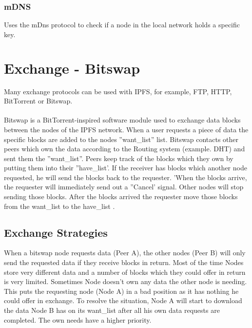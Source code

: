\documentclass[a4paper,11pt, oneside]{report}
\theoremstyle{definition}
\begin{document}
\subsubsection{mDNS}
Uses the mDns protocol to check if a node in the local network holds a specific key.


\newpage
\section{Exchange - Bitswap}
Many exchange protocols can be used with IPFS, for example, FTP, HTTP, BitTorrent or Bitswap.\\ \\
Bitswap is a BitTorrent-inspired software module used to exchange data blocks between the nodes of the IPFS network. When a user requests a piece of data the specific blocks are added to the nodes ''want\_list'' list. Bitswap contacts other peers which own the data according to the Routing system (example. DHT) and sent them the ''want\_list''. Peers keep track of the blocks which they own by putting them into their ''have\_list'. If the receiver has blocks which another node requested, he will send the blocks back to the requester. 'When the blocks arrive, the requester will immediately send out a ''Cancel' signal. Other nodes will stop sending those blocks. After the blocks arrived the requester move those blocks from the want\_list to the have\_list  \cite{bitswap}.

\subsection{Exchange Strategies}
When a bitswap node requests data (Peer A), the other nodes (Peer B) will only send the requested data if they receive blocks in return. Most of the time Nodes store very different data and a number of blocks which they could offer in return is very limited. Sometimes Node doesn't own any data the other node is needing. This puts the requesting node (Node A) in a bad position as it has nothing he could offer in exchange. To resolve the situation, Node A will start to download the data Node B has on its want\_list  after all his own data requests are completed.  The own needs have a higher priority.\\ \\
\end{document}

